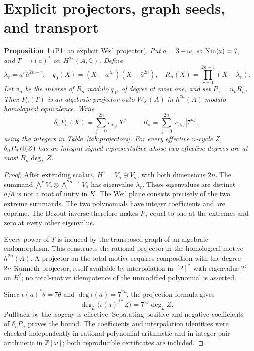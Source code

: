 \documentclass[11pt,a4paper]{article}
\newtheorem{proposition}[theorem]{Proposition}
\theoremstyle{definition}\newtheorem{definition}[theorem]{Definition}
\theoremstyle{remark}\newtheorem{remark}[theorem]{Remark}
\newcommand{\Q}{\mathbb Q}\newcommand{\Z}{\mathbb Z}\newcommand{\C}{\mathbb C}\newcommand{\R}{\mathbb R}
\begin{document}
\section{Explicit projectors, graph seeds, and transport}\label{sec:projector}
\begin{proposition}[P1: an explicit Weil projector]\label{P1}
Put $a=3+\omega$, so $\operatorname{Nm}(a)=7$, and $T=\iota(a)^*$ on $H^{2n}(A,\Q)$. Define
\[
 \lambda_r=a^r\bar a^{2n-r},\quad
 q_0(X)=(X-a^{2n})(X-\bar a^{2n}),\quad
 R_n(X)=\prod_{r=1}^{2n-1}(X-\lambda_r).
\]
Let $u_n$ be the inverse of $R_n$ modulo $q_0$, of degree at most one, and set $P_n=u_nR_n$. Then $P_n(T)$ is an algebraic projector onto $W_K(A)$ in $h^{2n}(A)$ modulo homological equivalence. Write
\[
 \delta_nP_n(X)=\sum_{j=0}^{2n}c_{n,j}X^j,\qquad
 B_n=\sum_{j=0}^{2n}|c_{n,j}|7^{nj},
\]
using the integers in Table~\ref{tab:projectors}. For every effective $n$-cycle $Z$, $\delta_nP_n\operatorname{cl}(Z)$ has an integral signed representative whose two effective degrees are at most $B_n\deg_L Z$.
\end{proposition}
\begin{proof}
After extending scalars, $H^1=V_\sigma\oplus V_{\bar\sigma}$, with both dimensions $2n$. The summand $\bigwedge^rV_\sigma\otimes\bigwedge^{2n-r}V_{\bar\sigma}$ has eigenvalue $\lambda_r$. These eigenvalues are distinct: $a/\bar a$ is not a root of unity in $K$. The Weil plane consists precisely of the two extreme summands. The two polynomials have integer coefficients and are coprime. The Bezout inverse therefore makes $P_n$ equal to one at the extremes and zero at every other eigenvalue.

Every power of $T$ is induced by the transposed graph of an algebraic endomorphism. This constructs the rational projector in the homological motive $h^{2n}(A)$. A projector on the total motive requires composition with the degree-$2n$ K\"unneth projector, itself available by interpolation in $[2]^*$ with eigenvalue $2^j$ on $H^j$; no total-motive idempotence of the unmodified polynomial is asserted.

Since $\iota(a)^*\theta=7\theta$ and $\deg\iota(a)=7^{2n}$, the projection formula gives
\[
 \deg_L\bigl(\iota(a)^{j*}Z\bigr)=7^{nj}\deg_L Z.
\]
Pullback by the isogeny is effective. Separating positive and negative coefficients of $\delta_nP_n$ proves the bound. The coefficients and interpolation identities were checked independently in rational-polynomial arithmetic and in integer-pair arithmetic in $\Z[\omega]$; both reproducible certificates are included.
\end{proof}
\end{document}
